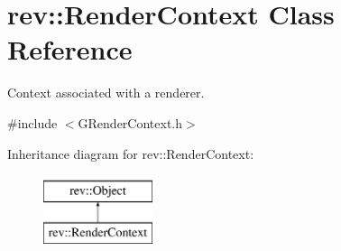\hypertarget{classrev_1_1_render_context}{}\section{rev\+::Render\+Context Class Reference}
\label{classrev_1_1_render_context}


Context associated with a renderer.  




{\ttfamily \#include $<$G\+Render\+Context.\+h$>$}

Inheritance diagram for rev\+::Render\+Context\+:\begin{figure}[H]
\begin{center}
\leavevmode
\includegraphics[height=2.000000cm]{classrev_1_1_render_context}
\end{center}
\end{figure}
